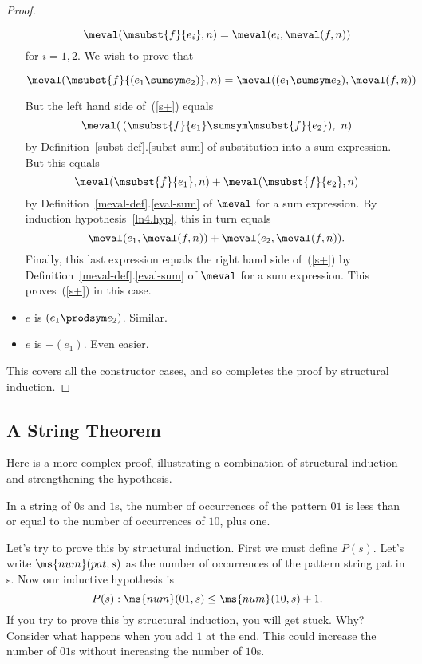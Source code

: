 \begin{definition}
\begin{proof}
\begin{itemize}
\begin{equation}\label{ln4.hyp}
\meval(\msubst{f}{e_i},n)  =  \meval(e_i, \meval(f,n))
\end{equation}
for $i= 1,2$.  We wish to prove that

\begin{equation}\label{s+}
\meval(\msubst{f}{(e_1\sumsym e_2)},n)  =  \meval((e_1 \sumsym e_2), \meval(f,n))
\end{equation}

But the left hand side of~(\ref{s+}) equals
\[
\meval(\, (\msubst{f}{e_1} \sumsym \msubst{f}{e_2}),\ n)
\]
by Definition~\ref{subst-def}.\ref{subst-sum} of substitution into a sum
expression.  But this equals
\[
\meval(\msubst{f}{e_1},n) + \meval(\msubst{f}{e_2},n)
\]
by Definition~\ref{meval-def}.\ref{eval-sum} of $\meval$ for a sum expression.  By
induction hypothesis~\eqref{ln4.hyp}, this in turn equals
\[
\meval(e_1,\meval(f,n)) + \meval(e_2,\meval(f,n)).
\]
Finally, this last expression equals the right hand side of~(\ref{s+}) by
Definition~\ref{meval-def}.\ref{eval-sum} of $\meval$ for a sum
expression.  This proves~(\ref{s+}) in this case.

\item $e$ is $(e_1 \prodsym e_2)$.  Similar.

\item $e$ is $-(e_1)$.  Even easier.

\end{itemize}

This covers all the constructor cases, and so completes the proof by
structural induction.

\end{proof}

\begin{staffnotes}

\subsection{A String Theorem}

Here is a more complex proof, illustrating a combination of structural
induction and strengthening the hypothesis.

\begin{theorem}
  In a string of $0$s and $1$s, the number of occurrences of the pattern
  $01$ is less than or equal to the number of occurrences of $10$, plus
  one.
\end{theorem}

Let's try to prove this by structural induction.  First we must
define $P(s)$.  Let's write $\ms{num}(pat,s)$ as the number of
occurrences of the pattern string pat in s.  Now our inductive
hypothesis is
\[
P(s): \ms{num}(01,s) \leq \ms{num}(10,s) + 1. 
\]
If you try to prove this by structural induction, you will get
stuck.
Why? 
Consider what happens when you add $1$ at the end.  
This could increase the number of $01$s without increasing the number of
$10$s. 


\end{staffnotes}
\end{definition}
